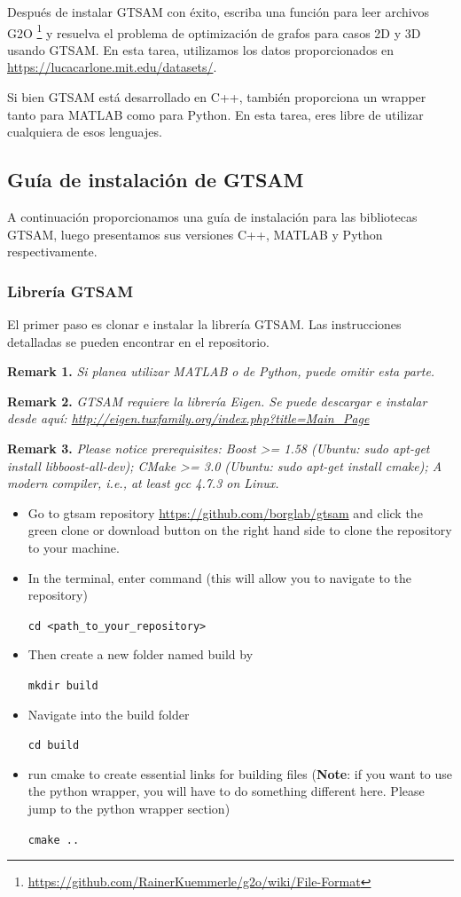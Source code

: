 \documentclass[tp]{lcc}
\begin{document}
Después de instalar GTSAM con éxito, escriba una función para leer archivos G2O \footnote{\url{https://github.com/RainerKuemmerle/g2o/wiki/File-Format}} y resuelva el problema de optimización de grafos para casos 2D y 3D usando GTSAM. En esta tarea, utilizamos los datos proporcionados en \url{https://lucacarlone.mit.edu/datasets/}.

Si bien GTSAM está desarrollado en C++, también proporciona un wrapper tanto para MATLAB como para Python. En esta tarea, eres libre de utilizar cualquiera de esos lenguajes.

\subsection*{Guía de instalación de GTSAM}
A continuación proporcionamos una guía de instalación para las bibliotecas GTSAM, luego presentamos sus versiones C++, MATLAB y Python respectivamente.

\subsubsection*{Librería GTSAM}
El primer paso es clonar e instalar la librería GTSAM. Las instrucciones detalladas se pueden encontrar en el repositorio.

\textbf{Remark 1.} \textit{Si planea utilizar MATLAB o de Python, puede omitir esta parte.}

\textbf{Remark 2.} \textit{GTSAM requiere la librería Eigen. Se puede descargar e instalar desde aquí: \url{http://eigen.tuxfamily.org/index.php?title=Main_Page}}

\textbf{Remark 3.} \textit{Please notice prerequisites: Boost >= 1.58 (Ubuntu: sudo apt-get install libboost-all-dev); CMake >= 3.0 (Ubuntu: sudo apt-get install cmake); A modern compiler, i.e., at least gcc 4.7.3 on Linux.}

\begin{itemize}
    \item Go to gtsam repository \url{https://github.com/borglab/gtsam} and click the green clone or download button on the right hand side to clone the repository to your machine.
    \item In the terminal, enter command (this will allow you to navigate to the repository)
    
    \lstinline[style=bash]{cd <path_to_your_repository>}
    
    \item Then create a new folder named build by
    
    \lstinline[style=bash]{mkdir build}
    
    \item Navigate into the build folder
    
    \lstinline[style=bash]{cd build}
    
    \item run cmake to create essential links for building files (\textbf{Note}: if you want to use the python wrapper, you will have to do something different here. Please jump to the python wrapper section)
    
    \lstinline[style=bash]{cmake ..}
\end{itemize}
\end{document}
